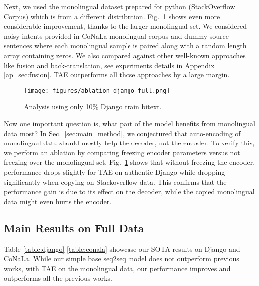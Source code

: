 Next, we used the monolingual dataset prepared for python (StackOverflow Corpus) which is from a different distribution. Fig.\ \ref{fig:semi-supervised-django}  shows even more considerable improvement, thanks to the larger monolingual set. We considered noisy intents provided in CoNaLa monolingual corpus and dummy source sentences where each monolingual sample is paired along with a random length array containing zeros. We also compared against other well-known approaches like fusion and back-translation, see experiments details in Appendix \ref{ap_sec:fusion}. TAE outperforms all those approaches by a large margin. 


\begin{figure}
    \centering
    \texttt{[image: figures/ablation\_django\_full.png]}
    \vspace{-1em}
    \caption{Analysis using only 10\% Django train bitext.}
    \label{fig:semi-supervised-django}
\vspace{-.5em}
\end{figure}










Now one important question is, what part of the model benefits from monolingual data most? In Sec.\ \ref{sec:main_method}, we conjectured that auto-encoding of monolingual data should mostly help the decoder, not the encoder. To verify this, we perform an ablation by comparing freezing encoder parameters versus not freezing over the monolingual set. Fig.\ \ref{fig:semi-supervised-django} shows that without freezing the encoder, performance drops slightly for TAE on authentic Django while dropping significantly when copying on Stackoverflow data. This confirms that the performance gain is due to its effect on the decoder, while the copied monolingual data might even hurts the encoder.



 




\vspace{-0.1em}
\subsection{Main Results on Full Data}
\vspace{-0.1em}

Table \ref{table:django}-\ref{table:conala} showcase our SOTA results on Django and CoNaLa. While our simple base seq2seq model does not outperform previous works, with TAE on the monolingual data, our performance improves and outperforms all the previous works. 


